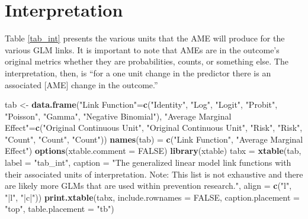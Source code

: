 \documentclass[]{article}
\newenvironment{Shaded}{\begin{snugshade}}{\end{snugshade}}
\newcommand{\KeywordTok}[1]{\textcolor[rgb]{0.13,0.29,0.53}{\textbf{#1}}}
\newcommand{\DataTypeTok}[1]{\textcolor[rgb]{0.13,0.29,0.53}{#1}}
\newcommand{\StringTok}[1]{\textcolor[rgb]{0.31,0.60,0.02}{#1}}
\newcommand{\OtherTok}[1]{\textcolor[rgb]{0.56,0.35,0.01}{#1}}
\newcommand{\NormalTok}[1]{#1}
\begin{document}
\section{Interpretation}\label{interpretation}

Table \ref{tab_int} presents the various units that the AME will produce
for the various GLM links. It is important to note that AMEs are in the
outcome's original metrics whether they are probabilities, counts, or
something else. The interpretation, then, is ``for a one unit change in
the predictor there is an associated {[}AME{]} change in the outcome.''

\begin{Shaded}
\begin{Highlighting}[]
\NormalTok{tab <-}\StringTok{ }\KeywordTok{data.frame}\NormalTok{(}\StringTok{"Link Function"}\NormalTok{=}\KeywordTok{c}\NormalTok{(}\StringTok{"Identity"}\NormalTok{, }\StringTok{"Log"}\NormalTok{, }\StringTok{"Logit"}\NormalTok{, }\StringTok{"Probit"}\NormalTok{, }\StringTok{"Poisson"}\NormalTok{, }\StringTok{"Gamma"}\NormalTok{, }\StringTok{"Negative Binomial"}\NormalTok{),}
                  \StringTok{"Average Marginal Effect"}\NormalTok{=}\KeywordTok{c}\NormalTok{(}\StringTok{"Original Continuous Unit"}\NormalTok{, }\StringTok{"Original Continuous Unit"}\NormalTok{, }\StringTok{"Risk"}\NormalTok{, }\StringTok{"Risk"}\NormalTok{, }\StringTok{"Count"}\NormalTok{, }\StringTok{"Count"}\NormalTok{, }\StringTok{"Count"}\NormalTok{))}
\KeywordTok{names}\NormalTok{(tab) =}\StringTok{ }\KeywordTok{c}\NormalTok{(}\StringTok{"Link Function"}\NormalTok{, }\StringTok{"Average Marginal Effect"}\NormalTok{)}
\KeywordTok{options}\NormalTok{(}\DataTypeTok{xtable.comment =} \OtherTok{FALSE}\NormalTok{)}
\KeywordTok{library}\NormalTok{(xtable)}
\NormalTok{tabx =}\StringTok{ }\KeywordTok{xtable}\NormalTok{(tab, }
       \DataTypeTok{label =} \StringTok{"tab_int"}\NormalTok{, }
       \DataTypeTok{caption =} \StringTok{"The generalized linear model link functions with their associated units of interpretation. Note: This list is not exhaustive and there are likely more GLMs that are used within prevention research."}\NormalTok{,}
       \DataTypeTok{align =} \KeywordTok{c}\NormalTok{(}\StringTok{"l"}\NormalTok{, }\StringTok{"|l"}\NormalTok{, }\StringTok{"|c|"}\NormalTok{))}
\KeywordTok{print.xtable}\NormalTok{(tabx, }\DataTypeTok{include.rownames =} \OtherTok{FALSE}\NormalTok{, }\DataTypeTok{caption.placement =} \StringTok{"top"}\NormalTok{,}
             \DataTypeTok{table.placement =} \StringTok{"tb"}\NormalTok{)}
\end{Highlighting}
\end{Shaded}
\end{document}
